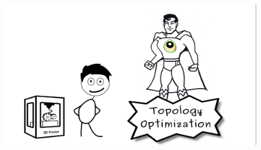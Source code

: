 
\begin{frame}
\begin{figure}

\vspace{-.7cm}	
\hspace{-2cm}		\includegraphics[width=1.2\linewidth]{Pictures/animations/animation_10.png}
		\end{figure}

\end{frame}

